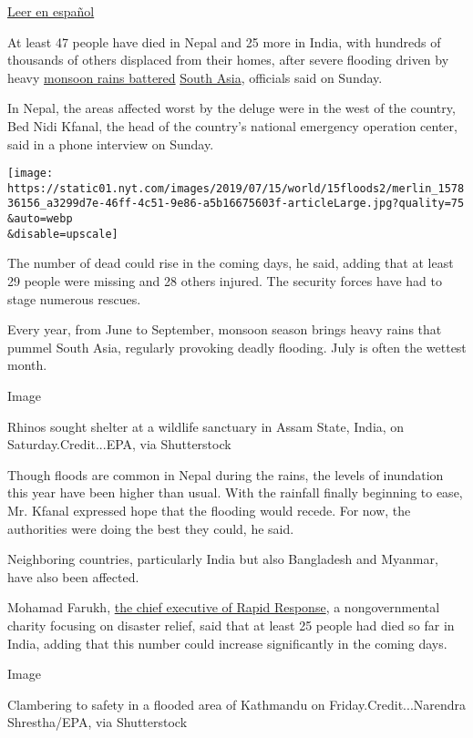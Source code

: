 \href{https://www.nytimes.com/es/2019/07/15/monzon-india-nepal/}{Leer en
español}

At least 47 people have died in Nepal and 25 more in India, with
hundreds of thousands of others displaced from their homes, after severe
flooding driven by heavy
\href{https://www.nytimes.com/2020/07/15/world/asia/monsoon-asia-bangladesh-india.html}{monsoon
rains battered}
\href{https://www.nytimes.com/2020/07/15/world/asia/monsoon-asia-bangladesh-india.html}{South
Asia}, officials said on Sunday.

In Nepal, the areas affected worst by the deluge were in the west of the
country, Bed Nidi Kfanal, the head of the country's national emergency
operation center, said in a phone interview on Sunday.

\texttt{[image: https://static01.nyt.com/images/2019/07/15/world/15floods2/merlin\_157836156\_a3299d7e-46ff-4c51-9e86-a5b16675603f-articleLarge.jpg?quality=75\\\&auto=webp\\\&disable=upscale]}

The number of dead could rise in the coming days, he said, adding that
at least 29 people were missing and 28 others injured. The security
forces have had to stage numerous rescues.

Every year, from June to September, monsoon season brings heavy rains
that pummel South Asia, regularly provoking deadly flooding. July is
often the wettest month.

Image

Rhinos sought shelter at a wildlife sanctuary in Assam State, India, on
Saturday.Credit...EPA, via Shutterstock

Though floods are common in Nepal during the rains, the levels of
inundation this year have been higher than usual. With the rainfall
finally beginning to ease, Mr. Kfanal expressed hope that the flooding
would recede. For now, the authorities were doing the best they could,
he said.

Neighboring countries, particularly India but also Bangladesh and
Myanmar, have also been affected.

Mohamad Farukh,
\href{https://twitter.com/RapidResponse/status/1150243766000766976}{the
chief executive of Rapid Response}, a nongovernmental charity focusing
on disaster relief, said that at least 25 people had died so far in
India, adding that this number could increase significantly in the
coming days.

Image

Clambering to safety in a flooded area of Kathmandu on
Friday.Credit...Narendra Shrestha/EPA, via Shutterstock

